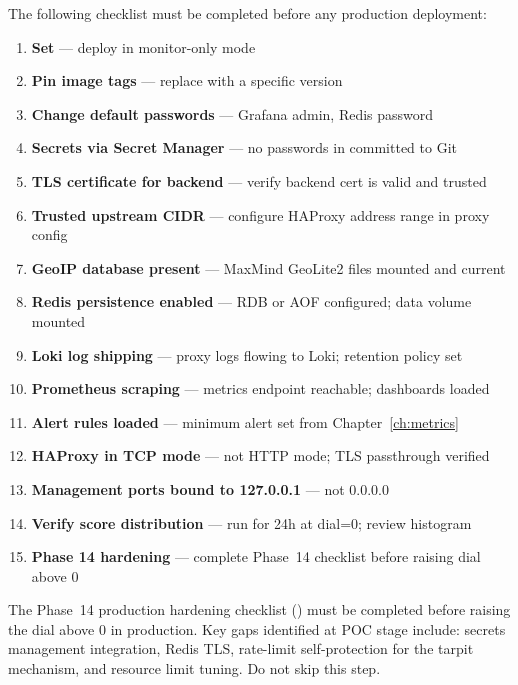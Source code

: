 The following checklist must be completed before any production deployment:

\begin{enumerate}
  \item[\(\square\)] \textbf{Set } — deploy in monitor-only mode
  \item[\(\square\)] \textbf{Pin image tags} — replace  with a specific version
  \item[\(\square\)] \textbf{Change default passwords} — Grafana admin, Redis password
  \item[\(\square\)] \textbf{Secrets via Secret Manager} — no passwords in  committed to Git
  \item[\(\square\)] \textbf{TLS certificate for backend} — verify backend cert is valid and trusted
  \item[\(\square\)] \textbf{Trusted upstream CIDR} — configure HAProxy address range in proxy config
  \item[\(\square\)] \textbf{GeoIP database present} — MaxMind GeoLite2 files mounted and current
  \item[\(\square\)] \textbf{Redis persistence enabled} — RDB or AOF configured; data volume mounted
  \item[\(\square\)] \textbf{Loki log shipping} — proxy logs flowing to Loki; retention policy set
  \item[\(\square\)] \textbf{Prometheus scraping} — metrics endpoint reachable; dashboards loaded
  \item[\(\square\)] \textbf{Alert rules loaded} — minimum alert set from Chapter~\ref{ch:metrics}
  \item[\(\square\)] \textbf{HAProxy in TCP mode} — not HTTP mode; TLS passthrough verified
  \item[\(\square\)] \textbf{Management ports bound to 127.0.0.1} — not 0.0.0.0
  \item[\(\square\)] \textbf{Verify score distribution} — run for 24h at dial=0; review histogram
  \item[\(\square\)] \textbf{Phase 14 hardening} — complete Phase~14 checklist before raising dial above 0
\end{enumerate}

\begin{notebox}
The Phase~14 production hardening checklist ()
must be completed before raising the dial above 0 in production. Key gaps identified
at POC stage include: secrets management integration, Redis TLS, rate-limit self-protection
for the tarpit mechanism, and resource limit tuning. Do not skip this step.
\end{notebox}
